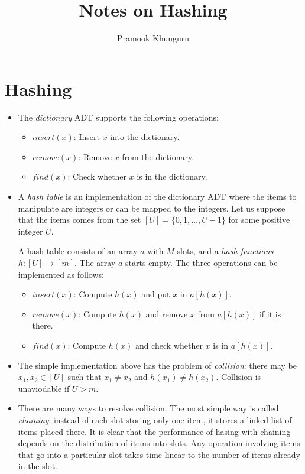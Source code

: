 \documentclass{article}
\title{Notes on Hashing}
\author{Pramook Khungurn}
\begin{document}
\maketitle

\section{Hashing}
\begin{itemize}
\item The \emph{dictionary} ADT supports the following operations:
\begin{itemize}
\item $insert(x)$: Insert $x$ into the dictionary.
\item $remove(x)$: Remove $x$ from the dictionary.
\item $find(x)$: Check whether $x$ is in the dictionary.
\end{itemize}

\item A \emph{hash table} is an implementation of the dictionary ADT where the items to manipulate are integers or can be mapped to the integers. Let us suppose that the items comes from the set $[U] = \{0, 1, \dotsc, U-1\}$ for some positive integer $U$. 

A hash table consists of an array $a$ with $M$ slots, and a \emph{hash functions} $h: [U] \rightarrow [m].$ The array $a$ starts empty. The three operations can be implemented as follows:
\begin{itemize}
\item $insert(x)$: Compute $h(x)$ and put $x$ in $a[h(x)]$.
\item $remove(x)$: Compute $h(x)$ and remove $x$ from $a[h(x)]$ if it is there.
\item $find(x)$: Compute $h(x)$ and check whether $x$ is in $a[h(x)]$.
\end{itemize}

\item The simple implementation above has the problem of \emph{collision}: there may be $x_1, x_2 \in [U]$ such that $x_1 \neq x_2$ and $h(x_1) \neq h(x_2)$. Collision is unaviodable if $U > m$.

\item There are many ways to resolve collision. The most simple way is called \emph{chaining}: instead of each slot storing only one item, it stores a linked list of items placed there. It is clear that the performance of hasing with chaining depends on the distribution of items into slots. Any operation involving items that go into a particular slot takes time linear to the number of items already in the slot.


\end{itemize}
\end{document}
